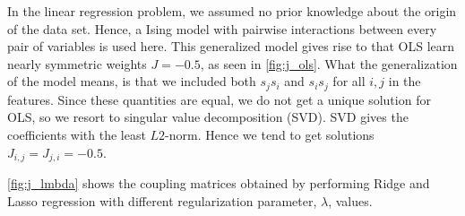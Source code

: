 In the linear regression problem, we assumed no prior knowledge about the origin of the data set. Hence, a Ising model with pairwise interactions between every pair of variables is used here. This generalized model gives rise to that OLS learn nearly symmetric weights $J=-0.5$, as seen in \autoref{fig:j_ols}. What the generalization of the model means, is that we included both $s_j s_i$ and $s_i s_j$ for all $i,j$ in the features. Since these quantities are equal, we do not get a unique solution for OLS, so we resort to singular value decomposition (SVD). SVD gives the coefficients with the least $L2$-norm. Hence we tend to get solutions $J_{i,j}=J_{j,i}=-0.5$.


\autoref{fig:j_lmbda} shows the coupling matrices obtained by performing Ridge and Lasso regression with different regularization parameter, $\lambda$, values.

